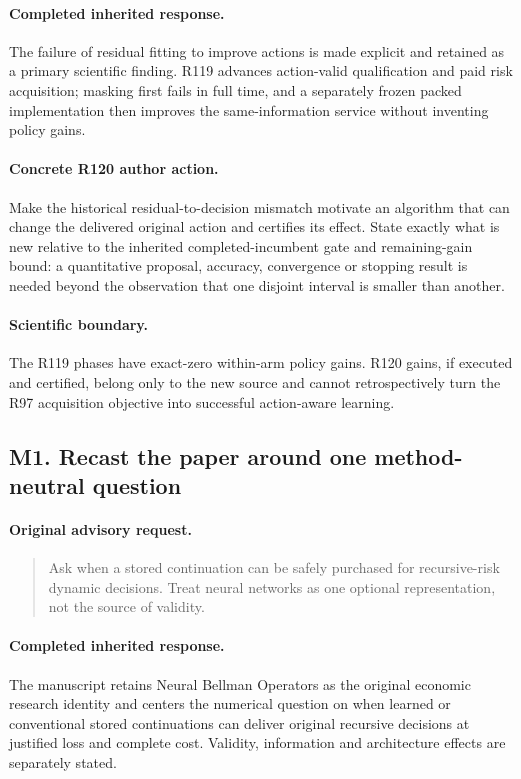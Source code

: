 \paragraph{Completed inherited response.}
The failure of residual fitting to improve actions is made explicit and retained as a primary scientific finding. R119 advances action-valid qualification and paid risk acquisition; masking first fails in full time, and a separately frozen packed implementation then improves the same-information service without inventing policy gains.
\paragraph{Concrete R120 author action.}
Make the historical residual-to-decision mismatch motivate an algorithm that can change the delivered original action and certifies its effect. State exactly what is new relative to the inherited completed-incumbent gate and remaining-gain bound: a quantitative proposal, accuracy, convergence or stopping result is needed beyond the observation that one disjoint interval is smaller than another.
\paragraph{Scientific boundary.}
The R119 phases have exact-zero within-arm policy gains. R120 gains, if executed and certified, belong only to the new source and cannot retrospectively turn the R97 acquisition objective into successful action-aware learning.

\subsection{M1. Recast the paper around one method-neutral question}
\label{response120:M1}
\paragraph{Original advisory request.}
\begin{quote}
Ask when a stored continuation can be safely purchased for recursive-risk dynamic decisions. Treat neural networks as one optional representation, not the source of validity.
\end{quote}
\paragraph{Completed inherited response.}
The manuscript retains Neural Bellman Operators as the original economic research identity and centers the numerical question on when learned or conventional stored continuations can deliver original recursive decisions at justified loss and complete cost. Validity, information and architecture effects are separately stated.
